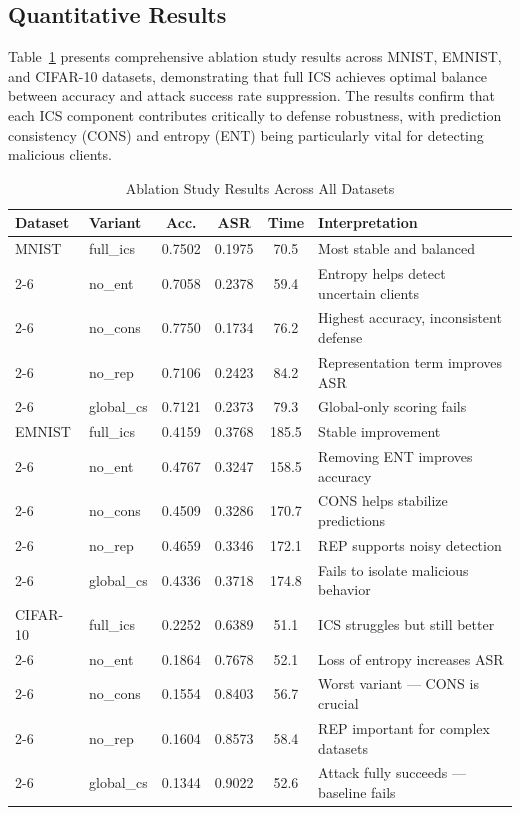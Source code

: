 \documentclass[conference]{IEEEtran}
\begin{document}
\subsection{Quantitative Results}
Table~\ref{tab:ablation_results} presents comprehensive ablation study results across MNIST, EMNIST, and CIFAR-10 datasets, demonstrating that full ICS achieves optimal balance between accuracy and attack success rate suppression. The results confirm that each ICS component contributes critically to defense robustness, with prediction consistency (CONS) and entropy (ENT) being particularly vital for detecting malicious clients.
\begin{table}[h]
\centering
\caption{Ablation Study Results Across All Datasets}
\label{tab:ablation_results}
\scriptsize
\begin{tabular}{|l|l|c|c|c|p{2.2cm}|}
\hline
\textbf{Dataset} & \textbf{Variant} & \textbf{Acc.} & \textbf{ASR} & \textbf{Time} & \textbf{Interpretation} \\ \hline
MNIST & full\_ics & 0.7502 & 0.1975 & 70.5 & Most stable and balanced \\ \cline{2-6}
      & no\_ent & 0.7058 & 0.2378 & 59.4 & Entropy helps detect uncertain clients \\ \cline{2-6}
      & no\_cons & 0.7750 & 0.1734 & 76.2 & Highest accuracy, inconsistent defense \\ \cline{2-6}
      & no\_rep & 0.7106 & 0.2423 & 84.2 & Representation term improves ASR \\ \cline{2-6}
      & global\_cs & 0.7121 & 0.2373 & 79.3 & Global-only scoring fails \\ \hline
EMNIST & full\_ics & 0.4159 & 0.3768 & 185.5 & Stable improvement \\ \cline{2-6}
       & no\_ent & 0.4767 & 0.3247 & 158.5 & Removing ENT improves accuracy \\ \cline{2-6}
       & no\_cons & 0.4509 & 0.3286 & 170.7 & CONS helps stabilize predictions \\ \cline{2-6}
       & no\_rep & 0.4659 & 0.3346 & 172.1 & REP supports noisy detection \\ \cline{2-6}
       & global\_cs & 0.4336 & 0.3718 & 174.8 & Fails to isolate malicious behavior \\ \hline
CIFAR-10 & full\_ics & 0.2252 & 0.6389 & 51.1 & ICS struggles but still better \\ \cline{2-6}
         & no\_ent & 0.1864 & 0.7678 & 52.1 & Loss of entropy increases ASR \\ \cline{2-6}
         & no\_cons & 0.1554 & 0.8403 & 56.7 & Worst variant — CONS is crucial \\ \cline{2-6}
         & no\_rep & 0.1604 & 0.8573 & 58.4 & REP important for complex datasets \\ \cline{2-6}
         & global\_cs & 0.1344 & 0.9022 & 52.6 & Attack fully succeeds — baseline fails \\ \hline
\end{tabular}
\end{table}
\end{document}
